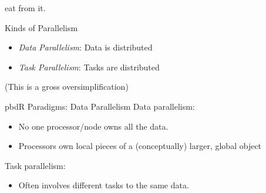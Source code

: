 eat from it.\\

\begin{frame}
  \begin{block}{Kinds of Parallelism}\pause
    \begin{itemize}[<+-|alert@+>]
      \item \emph{Data Parallelism}:  Data is distributed
      \item \emph{Task Parallelism}:  Tasks are distributed
  \end{itemize}
  (This is a gross oversimplification)
  \end{block}
\end{frame}


\begin{frame}
  \begin{block}{pbdR Paradigms:  Data Parallelism}
  Data parallelism:
  \begin{itemize}[<+-|alert@+>]
   \item No one processor/node owns all the data.
   \item Processors own local pieces of a (conceptually) larger, global object
  \end{itemize}
  
  Task parallelism:
  \begin{itemize}
    \item Often involves different tasks to the same data.
  \end{itemize}
  \end{block}
\end{frame}


